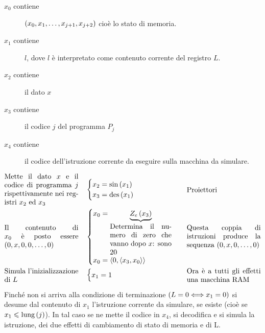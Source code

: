 \documentclass{lectures}
\begin{document}
\begin{definition}[Interprete]
\begin{multicols}{2}
        \begin{description}
            \item[\(x_0\) contiene] \(\left(x_0, x_1, \ldots, x_{j+1}, x_{j+2}\right)\) cioè lo stato di memoria.
            \item[\(x_1\) contiene] \(l\), dove \(l\) è interpretato come contenuto corrente del registro \(L\).
            \item[\(x_2\) contiene] il dato \(x\)
            \item[\(x_3\) contiene] il codice \(j\) del programma \(P_j\)
            \item[\(x_4\) contiene] il codice dell'istruzione corrente da eseguire sulla macchina da simulare.
        \end{description}
    \end{multicols}
    \vspace{-1.5em}
    \begin{align*}
        &\parbox{0.3\textwidth}{Mette il dato \(x\) e il codice di programma \(j\) rispettivamente nei registri \(x_2\) ed \(x_3\)} \quad \begin{cases}
            x_2 = \text{sin}\rnd{x_1}\\
            x_3 = \text{des}\rnd{x_1}\\
        \end{cases} & \parbox{0.3\textwidth}{Proiettori}\\
        & \parbox{0.3\textwidth}{Il contenuto di \(x_0\) è posto essere \(\rnd{0, x, 0, 0, \ldots, 0}\)} \quad \begin{cases}
            x_0 = \underbrace{Z_e\rnd{x_3}}_{
                \parbox{0.25\textwidth}{Determina il numero di zero che vanno dopo \(x\): sono 20}
            }\\
            x_0 = \ngle{0, \ngle{x_3, x_0}}
        \end{cases} & \parbox{0.3\textwidth}{Questa coppia di istruzioni produce la sequenza \(\rnd{0,x,0,\ldots,0}\)}\\
        & \parbox{0.3\textwidth}{Simula l'inizializzazione di \(L\)}  \quad \begin{cases}
            x_1 = 1
        \end{cases} & \parbox{0.3\textwidth}{Ora è a tutti gli effetti una macchina RAM}\\
    \end{align*}
    \vspace{-3em}
    \begin{multicols}{2}
        Finché non si arriva alla condizione di terminazione \(\left(L=0 \Longleftrightarrow x_1 = 0\right)\) si desume dal contenuto di \(x_1\) l'istruzione corrente da simulare, se esiste (cioè se \(x_1 \leqslant \text{lung}\left(j\right)\)). In tal caso se ne mette il codice in \(x_4\), si decodifica e si simula la istruzione, dei due effetti di cambiamento di stato di memoria e di L.
        

\end{multicols}
\end{definition}
\end{document}
